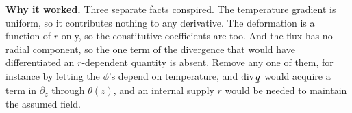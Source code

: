 \begin{solution}
\textbf{Why it worked.} Three separate facts conspired. The temperature
gradient is uniform, so it contributes nothing to any derivative. The
deformation is a function of $r$ only, so the constitutive coefficients
are too. And the flux has no radial component, so the one term of the
divergence that would have differentiated an $r$-dependent quantity is
absent. Remove any one of them, for instance by letting the $\phi$'s
depend on temperature, and $\dvg\bq$ would acquire a term in
$\partial_{z}$ through $\theta(z)$, and an internal supply $r$ would be
needed to maintain the assumed field.
\end{solution}
